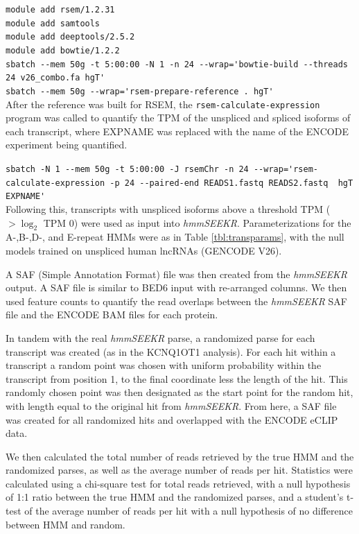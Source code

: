 \lstinline{module add rsem/1.2.31}\\
\lstinline{module add samtools}\\
\lstinline{module add deeptools/2.5.2}\\
\lstinline{module add bowtie/1.2.2}\\
\lstinline{sbatch --mem 50g -t 5:00:00 -N 1 -n 24 --wrap='bowtie-build --threads 24 v26_combo.fa hgT'}\\
\lstinline{sbatch --mem 50g --wrap='rsem-prepare-reference . hgT'}\\    


After the reference was built for RSEM, the \texttt{rsem-calculate-expression} program was called to quantify the TPM of the unspliced and spliced isoforms of each transcript, where EXPNAME was replaced with the name of the ENCODE experiment being quantified. 

\lstinline{sbatch -N 1 --mem 50g -t 5:00:00 -J rsemChr -n 24 --wrap='rsem-calculate-expression -p 24 --paired-end READS1.fastq READS2.fastq  hgT EXPNAME'}\\

Following this, transcripts with unspliced isoforms above a threshold TPM ($> \log_2$ TPM 0) were used as input into \emph{hmmSEEKR}. Parameterizations for the A-,B-,D-, and E-repeat HMMs were as in Table \ref{tbl:transparams}, with the null models trained on unspliced human lncRNAs (GENCODE V26).  

A SAF (Simple Annotation Format) file was then created from the \emph{hmmSEEKR} output. A SAF file is similar to BED6 input with re-arranged columns. We then used feature counts to quantify the read overlaps between the \emph{hmmSEEKR} SAF file and the ENCODE BAM files for each protein. 

In tandem with the real \emph{hmmSEEKR} parse, a randomized parse for each transcript was created (as in the KCNQ1OT1 analysis). For each hit within a transcript a random point was chosen with uniform probability within the transcript from position 1, to the final coordinate less the length of the hit. This randomly chosen point was then designated as the start point for the random hit, with length equal to the original hit from \emph{hmmSEEKR}. From here, a SAF file was created for all randomized hits and overlapped with the ENCODE eCLIP data. 

We then calculated the total number of reads retrieved by the true HMM and the randomized parses, as well as the average number of reads per hit. Statistics were calculated using a chi-square test for total reads retrieved, with a null hypothesis of 1:1 ratio between the true HMM and the randomized parses, and a student's t-test of the average number of reads per hit with a null hypothesis of no difference between HMM and random. 
\begin{singlespace}
\printbibliography[heading=bibintoc,title={References}]
\end{singlespace}